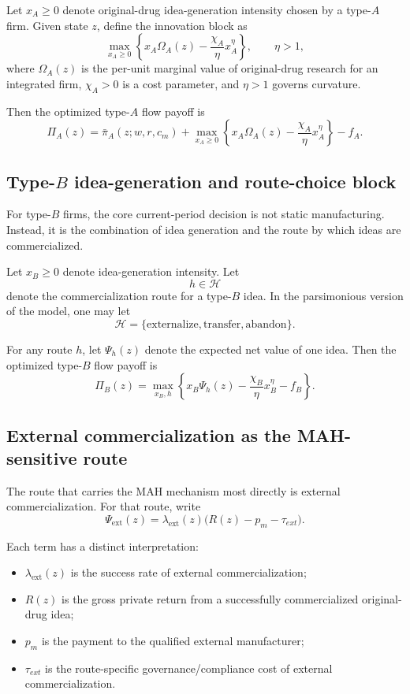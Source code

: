 \documentclass[12pt]{article}
\begin{document}
Let $x_A\ge 0$ denote original-drug idea-generation intensity chosen by a type-$A$ firm.
Given state $z$, define the innovation block as
\[
\max_{x_A\ge 0}
\left\{
x_A\Omega_A(z)-\frac{\chi_A}{\eta}x_A^\eta
\right\},
\qquad \eta>1,
\]
where $\Omega_A(z)$ is the per-unit marginal value of original-drug research for
an integrated firm, $\chi_A>0$ is a cost parameter, and $\eta>1$ governs curvature.

Then the optimized type-$A$ flow payoff is
\[
\Pi_A(z)
=
\bar{\pi}_A(z;w,r,c_m)
+
\max_{x_A\ge 0}
\left\{
x_A\Omega_A(z)-\frac{\chi_A}{\eta}x_A^\eta
\right\}
-f_A.
\]

\subsection{Type-$B$ idea-generation and route-choice block}

For type-$B$ firms, the core current-period decision is not static manufacturing.
Instead, it is the combination of idea generation and the route by which ideas
are commercialized.

Let $x_B\ge 0$ denote idea-generation intensity. Let
\[
h\in\mathcal{H}
\]
denote the commercialization route for a type-$B$ idea. In the parsimonious
version of the model, one may let
\[
\mathcal{H}=\{\text{externalize},\text{transfer},\text{abandon}\}.
\]

For any route $h$, let $\Psi_h(z)$ denote the expected net value of one idea.
Then the optimized type-$B$ flow payoff is
\[
\Pi_B(z)
=
\max_{x_B,h}
\left\{
x_B\Psi_h(z)-\frac{\chi_B}{\eta}x_B^\eta-f_B
\right\}.
\]

\subsection{External commercialization as the MAH-sensitive route}

The route that carries the MAH mechanism most directly is external commercialization.
For that route, write
\[
\Psi_{\mathrm{ext}}(z)
=
\lambda_{\mathrm{ext}}(z)\bigl(R(z)-p_m-\tau_{ext}\bigr).
\]

Each term has a distinct interpretation:

\begin{itemize}[leftmargin=2em]
    \item $\lambda_{\mathrm{ext}}(z)$ is the success rate of external commercialization;
    \item $R(z)$ is the gross private return from a successfully commercialized original-drug idea;
    \item $p_m$ is the payment to the qualified external manufacturer;
    \item $\tau_{ext}$ is the route-specific governance/compliance cost of external commercialization.
\end{itemize}
\end{document}
